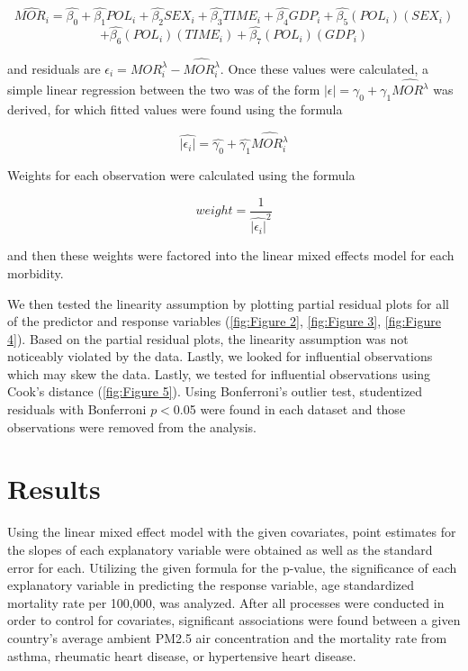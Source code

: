 \documentclass[12pt, letterpaper, twoside]{article}
\begin{document}
\[
  \hat{MOR_i} = \hat{\beta_{0}} + \hat{\beta_{1}}POL_i + \hat{\beta_{2}}SEX_i +
  \hat{\beta_{3}}TIME_i +\hat{\beta_{4}}GDP_i + \hat{\beta_{5}}(POL_i)(SEX_i)
\]
\[
+ \hat{\beta_{6}}(POL_i)(TIME_i) + \hat{\beta_{7}}(POL_i)(GDP_i)
\]

and residuals are \begin{math}\epsilon_i = MOR_i^{\lambda}-\hat{MOR_i^{\lambda}}
\end{math}. Once these values were calculated, a simple linear regression between
the two was of the form \begin{math}|\epsilon| = \gamma_0 + \gamma_1\hat{MOR^
{\lambda}}\end{math} was derived, for which fitted values were found using the
formula

\[
\hat{|\epsilon_i|} = \hat{\gamma_0} + \hat{\gamma_1}\hat{MOR_i^
{\lambda}}
\]

\par Weights for each observation were calculated using the formula

\[
weight = \frac{1}{\hat{|\epsilon_i|}^2}
\]

and then these weights were factored into the linear mixed effects model for
each morbidity.
\par We then tested the linearity assumption by plotting partial
residual plots for all of the predictor and response variables
(\autoref{fig:Figure 2}, \autoref{fig:Figure 3}, \autoref{fig:Figure 4}). Based
on the partial residual plots, the linearity assumption was not noticeably
violated by the data. Lastly, we looked for influential observations which may
skew the data. Lastly, we tested for influential observations using Cook's
distance (\autoref{fig:Figure 5}). Using Bonferroni's outlier test, studentized
residuals with Bonferroni \begin{math}p < \end{math}0.05 were found in each
dataset and those observations were removed from the analysis.

\section*{Results}
Using the linear mixed effect model with the given covariates, point estimates
for the slopes of each explanatory variable were obtained as well as the standard
error for each. Utilizing the given formula for the p-value, the significance of
each explanatory variable in predicting the response variable, age standardized
mortality rate per 100,000, was analyzed. After all processes were
conducted in order to control for covariates, significant associations were
found between a given country's average ambient PM2.5 air concentration and
the mortality rate from asthma, rheumatic heart disease, or hypertensive heart
disease.\par
\end{document}
